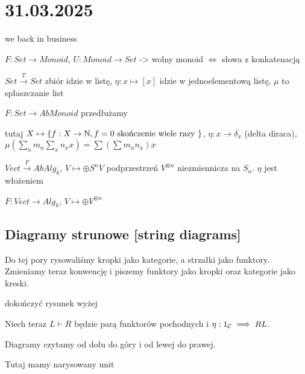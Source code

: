 \section{31.03.2025}{we back in business}

\begin{example}[m]
  \item $F:Set\to Monoid$, $U:Monoid\to Set$ -> wolny monoid $\iff$ słowa z konkatenacją

    $Set\xrightarrow{T}Set$ zbiór idzie w listę, $\eta:x\mapsto[x]$ idzie w jednoelementową listę, $\mu$ to spłaszczanie list
  \item $F: Set\to AbMonoid$ przedłużamy 

  tutaj $X\mapsto \{f:X\to \mathbb{N}, f=0\text{ skończenie wiele razy }\}$, $\eta:x\to \delta_x$ (delta diraca), $\mu(\sum_nm_n\sum_x n_x x)= \sum(\sum m_nn_x)x$
  \item $Vect\xrightarrow{F}AbAlg_k$, $V\mapsto\oplus S^nV$ podprzestrzeń $V^{\otimes n}$ niezmiennicza na $S_n$. $\eta$ jest włożeniem
  \item $F:Vect\to Alg_k$, $V\mapsto \oplus V^{\otimes n}$
\end{example}


\subsection{Diagramy strunowe [string diagrams]}

Do tej pory rysowaliśmy kropki jako kategorie, a strzałki jako funktory. Zmieniamy teraz konwencję i piszemy funktory jako kropki oraz kategorie jako kreski.

\begin{center}
\end{center}

dokończyć rysunek wyżej


Niech teraz $L\vdash R$ będzie parą funktorów pochodnych i $\eta:1_{\mathcal{C}}\implies RL$.

Diagramy czytamy od dołu do góry i od lewej do prawej.

Tutaj mamy narysowany unit
\begin{center}
\end{center}

